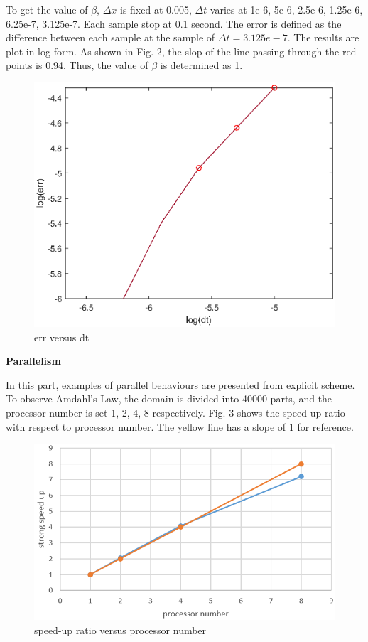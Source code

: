 \documentclass[a4paper,10pt]{article}
\begin{document}
To get the value of $\beta$, $\Delta x$ is fixed at 0.005, $\Delta t$ varies at 1e-6, 5e-6, 2.5e-6, 1.25e-6, 6.25e-7, 3.125e-7. Each sample stop at 0.1 second. The error is defined as the difference between each sample at the sample of $\Delta t = 3.125e-7$. The results are plot in log form. As shown in Fig. 2, the slop of the line passing through the red points is 0.94. Thus, the value of $\beta$ is determined as 1.
\begin{figure}[h]
	\centering
	\includegraphics[scale=1]{beta.eps}
	\caption{err versus dt}
\end{figure}

\clearpage

\large \textbf {Parallelism}

In this part, examples of parallel behaviours are presented from explicit scheme. To observe Amdahl's Law, the domain is divided into 40000 parts, and the processor number is set 1, 2, 4, 8 respectively. Fig. 3 shows the speed-up ratio with respect to processor number. The yellow line has a slope of 1 for reference. 
\begin{figure}[h]
	\centering
	\includegraphics[scale=0.6]{Amdahl.png}
	\caption{speed-up ratio versus processor number}
\end{figure} \\
\end{document}
